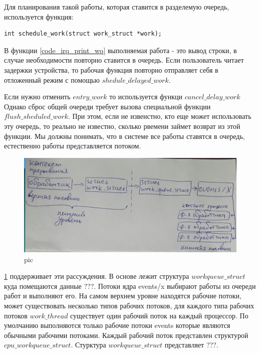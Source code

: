 Для планирования такой работы, которая ставится в разделемую очередь, используется функция:
\begin{lstlisting}
int schedule_work(struct work_struct *work);
\end{lstlisting}

 

В функции \ref{code_irq_print_wq} выполняемая работа - это вывод строки, в случае необходимости повторно ставится в очередь. Если пользователь читает задержки устройства, то рабочая функция повторно отправляет себя в отложенный режим с помощью $shedule\_delayed\_work$.

Если нужно отменить $entry\_work$ то используется функци $cancel\_delay\_work$ Однако сброс общей очереди требует вызова специальной функции $flush\_sheduled\_work$. При этом, если не извенстно, кто еще может использовать эту очередь, то реально не известно, сколько рвемени займет возврат из этой функции. Мы должны понимать, что в системе все работы ставятся в очередь, естественно работы представляется потоком. 

\begin{figure}[H]
  \centering
  \includegraphics[width=\textwidth]{pic/1.png}
  \caption{pic}
  \label{pic_run_queue_work}
\end{figure}

\ref{pic_run_queue_work} поддерживает эти рассуждения. В основе лежит структура $workqueue\_struct$ куда помещаются данные ???. Потоки ядра events/x выбирают работы из очереди работ и выполняют его. На самом верхнем уровне находятся рабочие потоки, может существовать несколько типов рабочих потоков, для каждого типа рабочих потоков $work\_thread$ существует один рабочий поток на каждый процессор. По умолчанию выполняются только рабочие потоки events которые являются обычными рабочими потоками. Каждый рабочий поток представлен структурой $cpu\_workqueue\_struct$. Стурктура $workqueue\_struct$ представляет ???.

